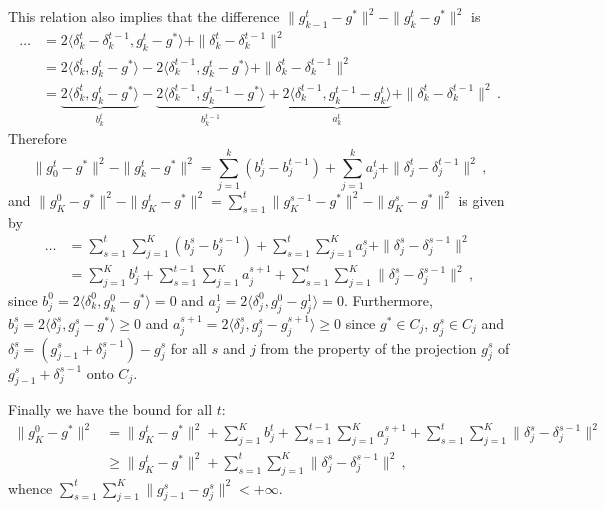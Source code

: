 \documentclass[a4paper]{article}
\begin{document}
This relation also implies that the difference $\|g^t_{k-1} - g^*\|^2 - \|g^t_k - g^*\|^2$ is
\begin{align*}
  \ldots
    &= 2 \langle \delta^t_k - \delta^{t-1}_k, g^t_k - g^* \rangle
      + \| \delta^t_k - \delta^{t-1}_k \|^2
    \\
    &= 2 \langle \delta^t_k, g^t_k - g^* \rangle
      - 2 \langle \delta^{t-1}_k, g^t_k - g^* \rangle
      + \| \delta^t_k - \delta^{t-1}_k \|^2
    \\
    &= \underbrace{2 \langle \delta^t_k, g^t_k - g^* \rangle}_{b^t_k}
      - \underbrace{2 \langle \delta^{t-1}_k, g^{t-1}_k - g^* \rangle}_{b^{t-1}_k}
      + \underbrace{2 \langle \delta^{t-1}_k, g^{t-1}_k - g^t_k\rangle}_{a^t_k}
      + \| \delta^t_k - \delta^{t-1}_k \|^2
    \,.
\end{align*}
Therefore
\begin{equation*}
  \|g^t_0 - g^*\|^2 - \|g^t_k - g^*\|^2
    = \sum_{j=1}^k (b^t_j - b^{t-1}_j)
      + \sum_{j=1}^k a^t_j + \| \delta^t_j - \delta^{t-1}_j \|^2
    \,,
\end{equation*}
and $\|g^0_K - g^*\|^2 - \|g^t_K - g^*\|^2 = \sum_{s=1}^t \|g^{s-1}_K - g^*\|^2 - \|g^s_K - g^*\|^2$
is given by
\begin{align*}
  \dots
    &= \sum_{s=1}^t \sum_{j=1}^K (b^s_j - b^{s-1}_j)
      + \sum_{s=1}^t \sum_{j=1}^K a^s_j + \| \delta^s_j - \delta^{s-1}_j \|^2
      \\
    &= \sum_{j=1}^K b^t_j
      + \sum_{s=1}^{t-1} \sum_{j=1}^K a^{s+1}_j
      + \sum_{s=1}^t \sum_{j=1}^K \| \delta^s_j - \delta^{s-1}_j \|^2
    \,,
\end{align*}
since $b^0_j = 2 \langle \delta^0_k, g^0_k - g^* \rangle = 0$ and $a^1_j = 2 \langle
\delta^0_j, g^0_j - g^1_j\rangle = 0$. Furthermore, $b^s_j = 2 \langle \delta^s_j,
g^s_j - g^* \rangle \geq 0$ and $a^{s+1}_j = 2 \langle \delta^s_j, g^s_j - g^{s+1}_j\rangle
\geq 0$ since $g^*\in C_j$, $g^s_j \in C_j$ and $\delta^s_j = (g^s_{j-1} + \delta^{s-1}_j)
- g^s_j$ for all $s$ and $j$ from the property of the projection $g^s_j$ of $g^s_{j-1}
+ \delta^{s-1}_j$ onto $C_j$.

Finally we have the bound for all $t$:
\begin{align*}
  \|g^0_K - g^*\|^2
    &= \|g^t_K - g^*\|^2
      + \sum_{j=1}^K b^t_j
      + \sum_{s=1}^{t-1} \sum_{j=1}^K a^{s+1}_j
      + \sum_{s=1}^t \sum_{j=1}^K \| \delta^s_j - \delta^{s-1}_j \|^2
      \\
    &\geq \|g^t_K - g^*\|^2
      + \sum_{s=1}^t \sum_{j=1}^K \| \delta^s_j - \delta^{s-1}_j \|^2
    \,,
\end{align*}
whence $\sum_{s=1}^t \sum_{j=1}^K \| g^s_{j-1} - g^s_j \|^2 < +\infty$.
\end{document}
